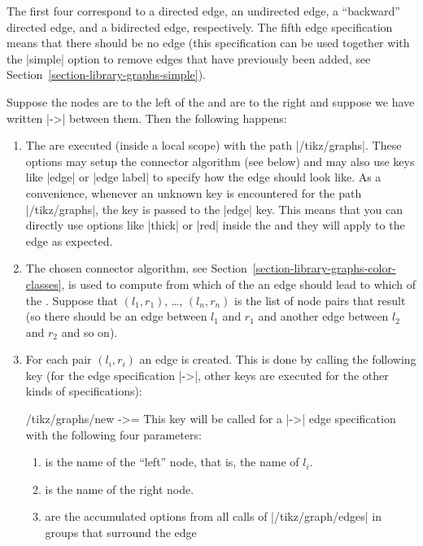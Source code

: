 The first four correspond to a directed edge, an undirected edge, a
``backward'' directed edge, and a bidirected edge, respectively. The
fifth edge specification means that there should be no edge (this
specification can be used together with the |simple| option to remove
edges that have previously been added, see
Section~\ref{section-library-graphs-simple}). 

Suppose the nodes  are to the left of the  and  are to the right and suppose
we have written |->| between them. Then the following happens:
\begin{enumerate}
\item The  are executed (inside a local scope) with the
  path |/tikz/graphs|.  These options may setup the connector algorithm
  (see below) and may also use keys like |edge| or |edge label| to
  specify how the edge should look like. As a convenience, whenever an
  unknown key is encountered for the path |/tikz/graphs|, the key is
  passed to the |edge| key. This means that you can directly use
  options like |thick| or |red| inside the  and they
  will apply to the edge as expected.
\item The chosen connector algorithm, see 
  Section~\ref{section-library-graphs-color-classes}, is used to
  compute from which of the  an edge should lead to
  which of the . Suppose that $(l_1,r_1)$, \dots,
  $(l_n,r_n)$ is the list of node pairs that result (so there should
  be an edge between $l_1$ and $r_1$ and another edge between $l_2$
  and $r_2$ and so on).
\item For each pair $(l_i,r_i)$ an edge is created. This is done by
  calling the following key (for the edge specification |->|, other
  keys are executed for the other kinds of specifications):
  \begin{key}{/tikz/graphs/new ->=}
    This key will be called for a |->| edge specification with the
    following four parameters: 
    \begin{enumerate}
    \item {} is the name of the ``left'' node, that is,
      the name of $l_i$.
    \item {} is the name of the right node.
    \item {} are the accumulated options from all
      calls of |/tikz/graph/edges| in groups that surround the edge

\end{enumerate}
\end{key}
\end{enumerate}

